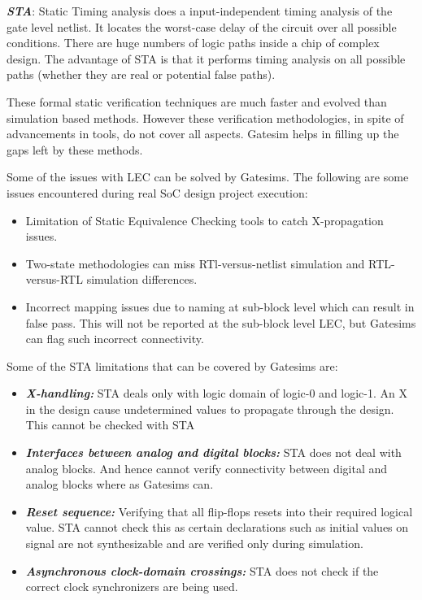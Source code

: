 \emph {\bf STA}: Static Timing analysis does a input-independent timing analysis of the gate level netlist. It locates the worst-case delay of the circuit over all possible conditions. There are huge numbers of logic paths inside a chip of complex design. The advantage of STA is that it performs timing analysis on all possible paths (whether they are real or potential false paths). 



These formal static verification techniques are much faster and evolved than simulation based methods. However these verification methodologies, in spite of advancements in tools, do not cover all aspects. Gatesim helps in filling up the gaps left by these methods. 

Some of the issues with LEC can be solved by Gatesims. The following are some issues encountered during real SoC design project execution: 

\begin{itemize}
	\item Limitation of Static Equivalence Checking tools to catch X-propagation issues.
	\item Two-state methodologies can miss RTl-versus-netlist simulation and RTL-versus-RTL simulation differences.
	\item Incorrect mapping issues due to naming at sub-block level which can result in false pass. This will not be reported at the sub-block level LEC, but Gatesims can flag such incorrect connectivity.
\end{itemize}
Some of the STA limitations that can be covered by Gatesims are:
\begin{itemize}
	\item \emph{\bf X-handling:} STA deals only with logic domain of logic-0 and logic-1. An X in the design cause undetermined values to propagate through the design. This cannot be checked with STA
	\item \emph{\bf Interfaces between analog and digital blocks:} STA does not deal with analog blocks. And hence cannot verify connectivity between digital and analog blocks where as Gatesims can.
	\item \emph{\bf Reset sequence:} Verifying that all flip-flops resets into their required logical value. STA cannot check this as certain declarations such as initial values on signal are not synthesizable and are verified only during simulation.
	\item \emph{\bf Asynchronous clock-domain crossings:} STA does not check if the correct clock synchronizers are being used.
\end{itemize}








